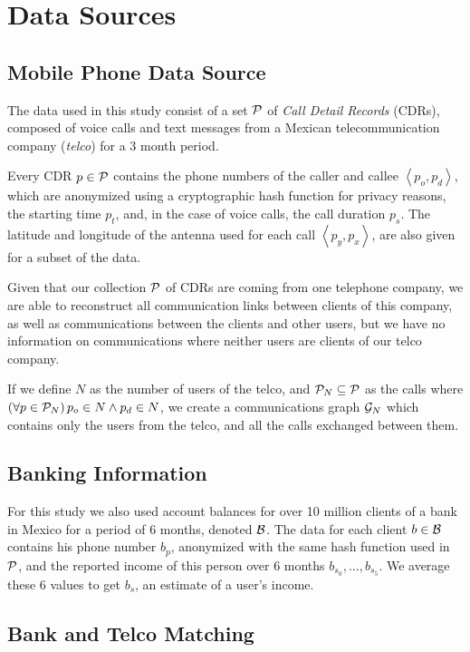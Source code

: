 \section{Data Sources}

\subsection{Mobile Phone Data Source}

The data used in this study consist of a set $\mathcal{P}$ of \textit{Call Detail Records} (CDRs), composed of voice calls and text messages from a Mexican telecommunication company (\textit{telco}) for a 3 month period.

Every CDR $p \in \mathcal{P}$ contains the phone numbers of the caller and callee $\left< p_o, p_d \right>$, which are anonymized using a cryptographic hash function for privacy reasons, the starting time $p_t$, and, in the case of voice calls, the call duration $p_s$. The latitude and longitude of the antenna used for each call $\left< p_y, p_x \right>$, are also given for a subset of the data.

Given that our collection $\mathcal{P}$ of CDRs are coming from one telephone company, we are able to reconstruct all communication links between clients of this company, as well as communications between the clients and other users, but we have no information on communications where neither users are clients of our telco company.

If we define $N$ as the number of users of the telco, and $\mathcal{P}_N \subseteq \mathcal{P}$ as the calls where $\left( \forall p \in \mathcal{P}_N \right) p_o \in N \wedge p_d \in N$, we create a communications graph $\mathcal{G}_N$ which contains only the users from the telco, and all the calls exchanged between them.

\subsection{Banking Information}

For this study we also used account balances for over 10 million clients of a bank in Mexico for a period of 6 months, denoted $\mathcal{B}$. The data for each client $b \in \mathcal{B}$ contains his phone number $b_p$, anonymized with the same hash function used in $\mathcal{P}$, and the reported income of this person over 6 months $b_{s_0}, \ldots, b_{s_5}$. We average these 6 values to get $b_s$, an estimate of a user's income.

\subsection{Bank and Telco Matching}

